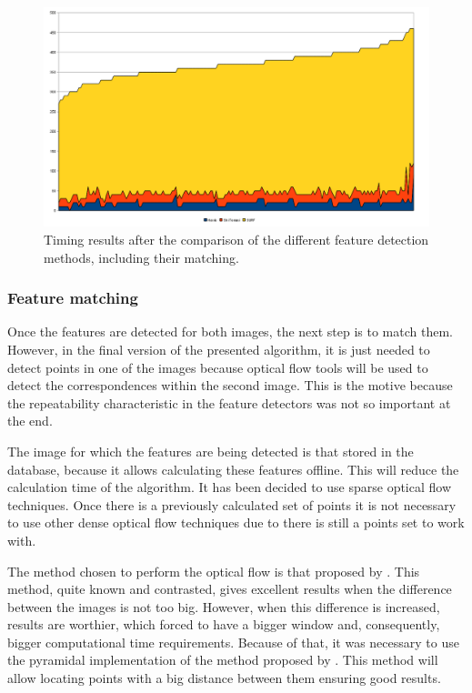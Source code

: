 \begin{figure}[h!]
\centering
\includegraphics{featuresTimeComparison}
\caption{Timing results after the comparison of the different feature detection methods, including their matching.}\label{fig:cp02_features_time_comparison}
\end{figure}

\subsubsection{Feature matching}\label{ch:chapter02_01_02_02}

Once the features are detected for both images, the next step is to match them. However, in the final version of the presented algorithm, it is just needed to detect points in one of the images because optical flow tools will be used to detect the correspondences within the second image. This is the motive because the repeatability characteristic in the feature detectors was not so important at the end.

The image for which the features are being detected is that stored in the database, because it allows calculating these features offline. This will reduce the calculation time of the algorithm. It has been decided to use sparse optical flow techniques. Once there is a previously calculated set of points it is not necessary to use other dense optical flow techniques due to there is still a points set to work with.

The method chosen to perform the optical flow is that proposed by \cite{lucas1981iterative}. This method, quite known and contrasted, gives excellent results when the difference between the images is not too big. However, when this difference is increased, results are worthier, which forced to have a bigger window and, consequently, bigger computational time requirements. Because of that, it was necessary to use the pyramidal implementation of the \cite{lucas1981iterative} method proposed by \cite{bouguet2001pyramidal}. This method will allow locating points with a big distance between them ensuring good results.

